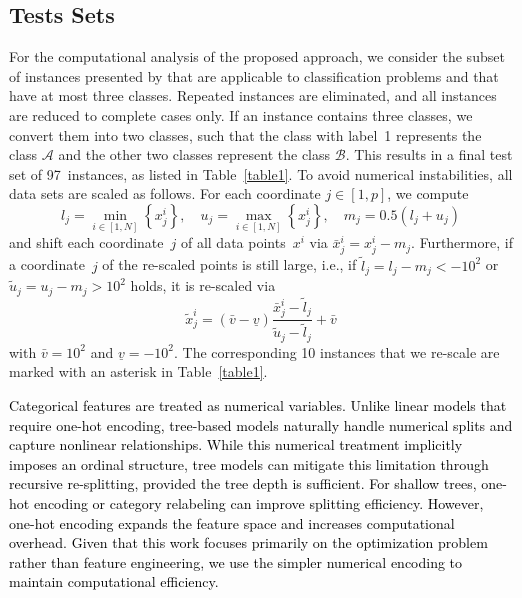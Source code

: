 \documentclass[a4paper,american,reqno]{amsart}
\newcommand{\Set}[1]{\left\{#1\right\}}
\newcommand{\rev}[1]{#1}
\newcommand{\revTwo}[1]{\textcolor{black}{#1}}
\begin{document}
\subsection{Tests Sets}
\label{subsection-test-sets}

For the computational analysis of the proposed approach, we
consider the subset of instances presented by \textcite{Olson2017PMLB}
that are applicable to classification problems and that have at most
three classes. Repeated instances are eliminated, and all instances
are reduced to complete cases only. If an instance contains three
classes, we convert them into two classes, such that the class with
label~1 represents the class  $\mathcal{A}$  and the other two classes
represent the class $\mathcal{B}$.
This results in a final test set of 97~instances, as listed in
Table~\ref{table1}.
To avoid numerical instabilities, all data sets are scaled as
follows.
For each coordinate $j \in [1,p]$, we compute
\begin{equation*}
  l_j = \min_{i \in [1,N]}\Set{x^i_j},
  \quad
  u_j = \max_{i \in [1,N]}\Set{x^i_j},
  \quad
  m_j = 0.5 \left(l_j + u_j \right)
\end{equation*}
and shift each coordinate~$j$ of all data points~$x^i$ via $\bar{x}^i_j
= x^i_j - m_j$. Furthermore, if a coordinate~$j$ of the
re-scaled points is still large, i.e.,  if $\tilde{l}_j = l_j - m_j <-
10^{2}$ or $\tilde{u}_j = u_j - m_j > 10^{2}$ holds, it is re-scaled
via
\begin{equation*}
  \tilde{x}^i_j = (\bar{v} - \underline{v} ) \frac{\bar{x}^i_j -
    \tilde{l}_j}{\tilde{u}_j-\tilde{l}_j} +  \bar{v}
\end{equation*}
with $\bar{v} = 10^2$ and $ \underline{v} = -10^{2}$.
The corresponding 10 instances that we re-scale are marked with an
asterisk in Table~\ref{table1}.

\revTwo{Categorical features are treated as numerical
  variables. Unlike linear models that require one-hot encoding,
  tree-based models naturally handle numerical splits and capture
  nonlinear relationships. While this numerical treatment implicitly
  imposes an ordinal structure, tree models can mitigate this
  limitation through recursive re-splitting, provided the tree depth
  is sufficient. For shallow trees, one-hot encoding or category
  relabeling can improve splitting efficiency. However, one-hot
  encoding expands the feature space and increases computational
  overhead. Given that this work focuses primarily on the optimization
  problem rather than feature engineering, we use the simpler
  numerical encoding to maintain computational efficiency.}
\end{document}
